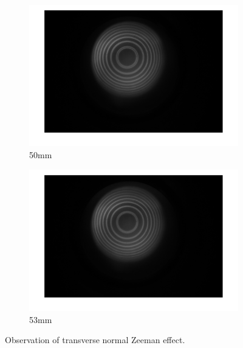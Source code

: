 \documentclass[a4paper,12pt]{article}
\begin{document}
\begin{figure}[H]
      \vspace{0.5cm}
    
      \begin{subfigure}[b]{0.3\textwidth}
        \includegraphics[width=1.2\textwidth]{tra_nor_stripe_50.png}
        \caption{50mm}
      \end{subfigure}
      \hfill
      \begin{subfigure}[b]{0.3\textwidth}
        \includegraphics[width=1.2\textwidth]{tra_nor_stripe_53.png}
        \caption{53mm}
      \end{subfigure}
    
      \caption{Observation of transverse normal Zeeman effect.}
      \label{fig:tra_nor_fiveimages}
    \end{figure}
    
\end{document}

